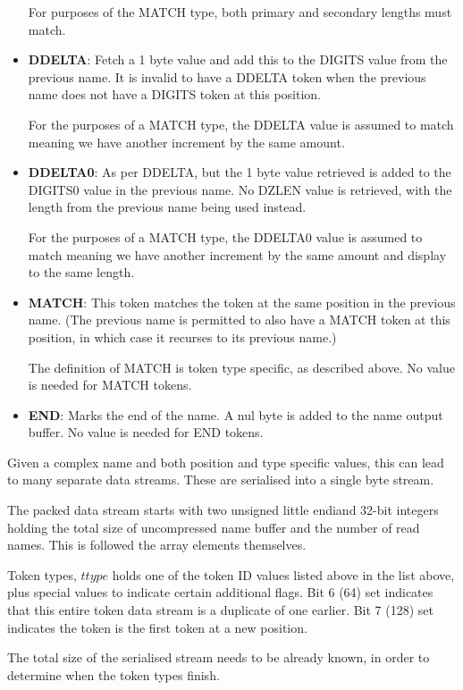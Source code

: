 \documentclass[a4paper]{article}
\begin{document}
\begin{itemize}
For purposes of the MATCH type, both primary and secondary lengths
must match.

\item{\textbf{DDELTA}:}
Fetch a 1 byte value and add this to the DIGITS value from the
previous name.  It is invalid to have a DDELTA token when the previous
name does not have a DIGITS token at this position.

For the purposes of a MATCH type, the DDELTA value is assumed to match
meaning we have another increment by the same amount.

\item{\textbf{DDELTA0}:}
As per DDELTA, but the 1 byte value retrieved is added to the DIGITS0
value in the previous name.  No DZLEN value is retrieved, with the
length from the previous name being used instead.

For the purposes of a MATCH type, the DDELTA0 value is assumed to match
meaning we have another increment by the same amount and display to
the same length.

\item{\textbf{MATCH}:}
This token matches the token at the same position in the previous
name.  (The previous name is permitted to also have a MATCH token at
this position, in which case it recurses to its previous name.)

The definition of MATCH is token type specific, as described above.
No value is needed for MATCH tokens.

\item{\textbf{END}:}
Marks the end of the name.  A nul byte is added to the name output
buffer.  No value is needed for END tokens.
\end{itemize}

Given a complex name and both position and type specific values, this
can lead to many separate data streams.  These are serialised into
a single byte stream.

The packed data stream starts with two unsigned little endiand 32-bit
integers holding the total size of uncompressed name buffer and the
number of read names.  This is followed the array elements
themselves.

Token types, $ttype$ holds one of the token ID values listed above
in the list above, plus special values to indicate certain additional
flags.  Bit 6 (64) set indicates that this entire token data stream is a
duplicate of one earlier.  Bit 7 (128) set indicates the token
is the first token at a new position.

The total size of the serialised stream needs to be already known, in
order to determine when the token types finish.
\end{document}
